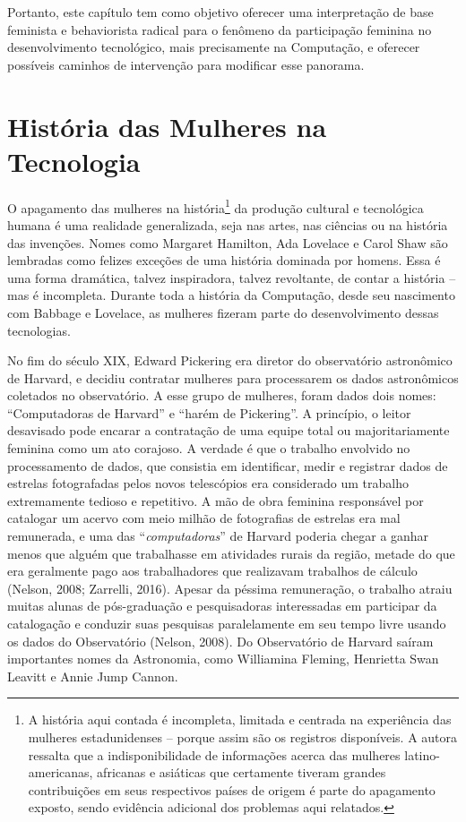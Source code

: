 Portanto, este capítulo tem como objetivo oferecer uma interpretação de base feminista e behaviorista radical para o fenômeno da participação feminina no desenvolvimento tecnológico, mais precisamente na Computação, e oferecer possíveis caminhos de intervenção para modificar esse panorama. 

\section*{História das Mulheres na Tecnologia}

O apagamento das mulheres na história\footnote{A história aqui contada é incompleta, limitada e centrada na experiência das mulheres estadunidenses – porque assim são os registros disponíveis. A autora ressalta que a indisponibilidade de informações acerca das mulheres latino-americanas, africanas e asiáticas que certamente tiveram grandes contribuições em seus respectivos países de origem é parte do apagamento exposto, sendo evidência adicional dos problemas aqui relatados.} da produção cultural e tecnológica humana é uma realidade generalizada, seja nas artes, nas ciências ou na história das invenções. Nomes como Margaret Hamilton, Ada Lovelace e Carol Shaw são lembradas como felizes exceções de uma história dominada por homens. Essa é uma forma dramática, talvez inspiradora, talvez revoltante, de contar a história – mas é incompleta. Durante toda a história da Computação, desde seu nascimento com Babbage e Lovelace, as mulheres fizeram parte do desenvolvimento dessas tecnologias. 

No fim do século XIX, Edward Pickering era diretor do observatório astronômico de Harvard, e decidiu contratar mulheres para processarem os dados astronômicos coletados no observatório. A esse grupo de mulheres, foram dados dois nomes: “Computadoras de Harvard” e “harém de Pickering”. A princípio, o leitor desavisado pode encarar a contratação de uma equipe total ou majoritariamente feminina como um ato corajoso. A verdade é que o trabalho envolvido no processamento de dados, que consistia em identificar, medir e registrar dados de estrelas fotografadas pelos novos telescópios era considerado um trabalho extremamente tedioso e repetitivo. A mão de obra feminina responsável por catalogar um acervo com meio milhão de fotografias de estrelas era mal remunerada, e uma das “\textit{computadoras}” de Harvard poderia chegar a ganhar menos que alguém que trabalhasse em atividades rurais da região, metade do que era geralmente pago aos trabalhadores que realizavam trabalhos de cálculo (Nelson, 2008; Zarrelli, 2016). Apesar da péssima remuneração, o trabalho atraiu muitas alunas de pós-graduação e pesquisadoras interessadas em participar da catalogação e conduzir suas pesquisas paralelamente em seu tempo livre usando os dados do Observatório (Nelson, 2008). Do Observatório de Harvard saíram importantes nomes da Astronomia, como Williamina Fleming, Henrietta Swan Leavitt e Annie Jump Cannon. 


